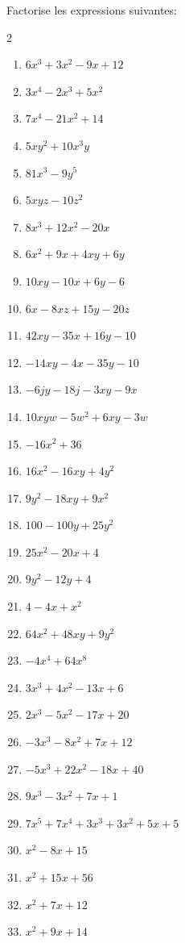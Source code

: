 \documentclass[a4paper, 12pt, parskip=half-]{scrartcl}
\begin{document}
\begin{exercise}
    Factorise les expressions suivantes:
    \begin{multicols}{2}
    \begin{enumerate}
        \item $6x^{3}+3x^{2}-9x+12$
        \item $3x^{4}-2x^{3}+5x^{2}$
        \item $7x^{4}-21x^{2}+14$
        \item $5xy^{2}+10x^{3}y$
        \item $81x^{3}-9y^{5}$
        \item $5xyz-10z^{2}$
        \item $8x^{3}+12x^{2}-20x$ 
        \item $6x^{2}+9x+4xy+6y$
        \item $10xy-10x+6y-6$
        \item $6x-8xz+15y-20z$
        \item $42xy-35x+16y-10$
        \item $-14xy-4x-35y-10$
        \item $-6jy-18j-3xy-9x$
        \item $10xyw-5w^{2}+6xy-3w$
        \item $-16x^{2}+36$
        \item $16x^{2}-16xy+4y^{2}$
        \item $9y^{2}-18xy+9x^{2}$
        \item $100-100y+25y^{2}$
        \item $25x^{2}-20x+4$
        \item $9y^{2}-12y+4$
        \item $4-4x+x^{2}$
        \item $64x^{2}+48xy+9y^{2}$
        \item $-4x^{4}+64x^{8}$
        \item $3x^{3}+4x^{2}-13x+6$
        \item $2x^{3}-5x^{2}-17x+20$
        \item $-3x^{3}-8x^{2}+7x+12$
        \item $-5x^{3}+22x^{2}-18x+40$
        \item $9x^{3}-3x^{2}+7x+1$
        \item $7x^{5}+7x^{4}+3x^{3}+3x^{2}+5x+5$
        \item $x^{2}-8x+15$
        \item $x^{2}+15x+56$
        \item $x^{2}+7x+12$
        \item $x^{2}+9x+14$

\end{enumerate}
\end{multicols}
\end{exercise}
\end{document}
